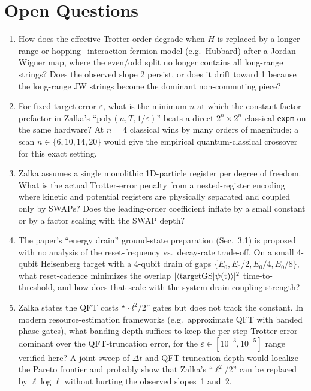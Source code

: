 \documentclass[11pt]{article}
\begin{document}
\section*{Open Questions}
\begin{enumerate}
  \item[\textbf{Q1.}] How does the effective Trotter order degrade
    when $H$ is replaced by a longer-range or hopping+interaction
    fermion model (e.g.\ Hubbard) after a Jordan-Wigner map, where the
    even/odd split no longer contains all long-range strings? Does the
    observed slope 2 persist, or does it drift toward 1 because the
    long-range JW strings become the dominant non-commuting piece?
  \item[\textbf{Q2.}] For fixed target error $\varepsilon$, what is the
    minimum $n$ at which the constant-factor prefactor in Zalka's
    ``$\mathrm{poly}(n,T,1/\varepsilon)$'' beats a direct
    $2^n\times 2^n$ classical \texttt{expm} on the same hardware?
    At $n=4$ classical wins by many orders of magnitude; a scan
    $n\in\{6,10,14,20\}$ would give the empirical
    quantum-classical crossover for this exact setting.
  \item[\textbf{Q3.}] Zalka assumes a single monolithic 1D-particle
    register per degree of freedom. What is the actual Trotter-error
    penalty from a nested-register encoding where kinetic and
    potential registers are physically separated and coupled only by
    SWAPs? Does the leading-order coefficient inflate by a small
    constant or by a factor scaling with the SWAP depth?
  \item[\textbf{Q4.}] The paper's ``energy drain'' ground-state
    preparation (Sec.~3.1) is proposed with no analysis of the
    reset-frequency vs.\ decay-rate trade-off. On a small 4-qubit
    Heisenberg target with a 4-qubit drain of gaps
    $\{E_0, E_0/2, E_0/4, E_0/8\}$, what reset-cadence
    minimizes the overlap $\lvert\langle\rm target\rm GS|\psi(t)\rangle
    \rvert^2$ time-to-threshold, and how does that scale with the
    system-drain coupling strength?
  \item[\textbf{Q5.}] Zalka states the QFT costs
    ``$\sim l^2/2$'' gates but does not track the constant. In modern
    resource-estimation frameworks (e.g.\ approximate QFT with
    banded phase gates), what banding depth suffices to keep the
    per-step Trotter error dominant over the QFT-truncation error,
    for the $\varepsilon\in[10^{-3},10^{-5}]$ range verified here?
    A joint sweep of $\Delta t$ and QFT-truncation depth would
    localize the Pareto frontier and probably show that Zalka's
    ``$\ell^2/2$'' can be replaced by $\ell\log \ell$ without hurting
    the observed slopes~1 and~2.
\end{enumerate}
\end{document}
